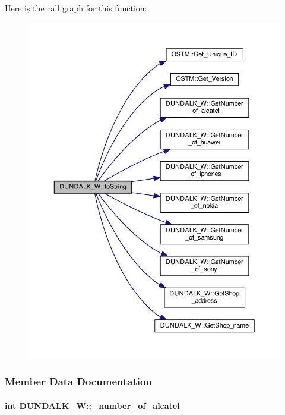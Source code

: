 Here is the call graph for this function\+:\nopagebreak
\begin{figure}[H]
\begin{center}
\leavevmode
\includegraphics[width=350pt]{class_d_u_n_d_a_l_k___w_aef2a8301835c60c21f9f3199259fed87_aef2a8301835c60c21f9f3199259fed87_cgraph}
\end{center}
\end{figure}




\subsubsection{Member Data Documentation}
\paragraph[{\texorpdfstring{\+\_\+number\+\_\+of\+\_\+alcatel}{_number_of_alcatel}}]{\setlength{\rightskip}{0pt plus 5cm}int D\+U\+N\+D\+A\+L\+K\+\_\+\+W\+::\+\_\+number\+\_\+of\+\_\+alcatel\hspace{0.3cm}{\ttfamily [private]}}\hypertarget{class_d_u_n_d_a_l_k___w_a67a471ec2d409a309ebc179ff4d789bc_a67a471ec2d409a309ebc179ff4d789bc}{}\label{class_d_u_n_d_a_l_k___w_a67a471ec2d409a309ebc179ff4d789bc_a67a471ec2d409a309ebc179ff4d789bc}


